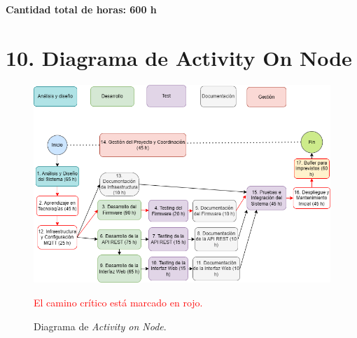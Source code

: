 \documentclass[
11pt, %
]{charter}
\begin{document}
\textbf{Cantidad total de horas: 600 h}

\newpage

\section{10. Diagrama de Activity On Node}
\label{sec:AoN}
\vspace{2cm}
\begin{figure}[htpb]
\centering 
\includegraphics[width=1.1\textwidth]{./Figuras/AoN.png}
\caption{Diagrama de \textit{Activity on Node}.}
\label{fig:AoN}
   
\vspace{0.5em}
{\small \textcolor{red}{El camino crítico está marcado en rojo.}}
\end{figure}

\newpage
\end{document}
